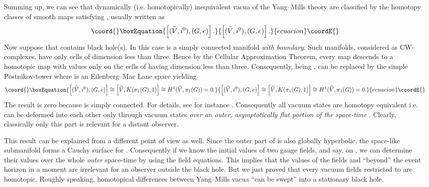 \documentclass[a4paper,12pt,draft]{article}
\begin{document}
Summing up, we can see that dynamically (i.e. homotopically) inequivalent
vacua of the Yang--Mills theory are classified by the
homotopy classes of smooth maps \coordHE{}
satisfying \coordHE{}, usually written as  
\begin{equation}\coord{}\boxEquation{
\left[(\widetilde{V}, i^0), (G, e)\right].
\label{vakuum}
}{
\left[(\widetilde{V}, i^0), (G, e)\right].
}{ecuacion}\coordE{}\end{equation}
Now suppose that \coordHE{} contains black hole(s). In this case
\coordHE{} is a simply connected manifold {\it with boundary}. 
Such manifolds, considered as CW-complexes, have only cells of dimension
less than three. Hence by the Cellular Approximation Theorem, every
map \coordHE{} descends to a homotopic map
with values only on the cells of \coordHE{} having dimension less than three.
Consequently, being \coordHE{}, \coordHE{} can be replaced by the simple
Postnikov-tower \coordHE{} where \coordHE{} is an
Eilenberg--Mac Lane space yielding
\begin{equation}\coord{}\boxEquation{
\left[(\widetilde{V}, i^0), (G,e)\right]\cong
\left[\widetilde{V},
K(\pi_1(G), 1)\right]\cong H^1(\widetilde{V},
\pi_1(G))=0.
\label{szamolas}
}{
\left[(\widetilde{V}, i^0), (G,e)\right]\cong
\left[\widetilde{V},
K(\pi_1(G), 1)\right]\cong H^1(\widetilde{V},
\pi_1(G))=0.
}{ecuacion}\coordE{}\end{equation}
The result is zero because \coordHE{} is simply connected. For
details, see for instance \cite{spa}. Consequently all vacuum states are
homotopy equivalent i.e. can be deformed into each other only through
vacuum states {\it over an outer, asymptotically flat portion \coordHE{} of
the space-time \coordHE{}}. Clearly, classically only this part is relevant
for a distant observer. 

This result can be explained from a different point of view as well. Since
the outer part \coordHE{} of \coordHE{} is also globally hyperbolic, the space-like
submanifold \coordHE{} forms a Cauchy surface for \coordHE{}. Consequently if we know
the initial values of two gauge fields, \coordHE{} and  \coordHE{} say, on \coordHE{}, we can determine their values over the whole {\it outer} space-time
\coordHE{} by using the field equations. This implies that the values of
the fields \coordHE{} and \coordHE{} ``beyond'' the event horizon in a moment are
irrelevant for an observer outside the black hole. But we just proved that
every vacuum fields restricted to \coordHE{} are homotopic. Roughly speaking,
homotopical differences between Yang--Mills vacua ``can be swept'' into a
stationary black hole. 
\end{document}
